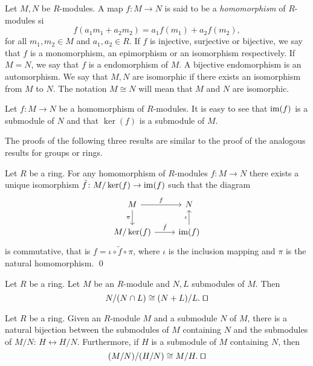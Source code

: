 Let $M,N$ be $R$-modules. A map $f\colon M\rightarrow
N$ is said to be a {\em homomorphism} of $R$-modules si
$$f(a_1m_1+a_2m_2)=a_1f(m_1)+a_2f(m_2),$$
for all $m_1,m_2\in M$ and $a_1,a_2\in R$.
If $f$ is injective, surjective or bijective, we say that $f$ is
a monomorphism, an epimorphism or an isomorphism respectively. If $M=N$, we say that
$f$ is a endomorphism of $M$. A bijective endomorphism is an
automorphism. We say that $M,N$ are isomorphic if there exists an isomorphism from $M$ to $N$. The notation
$M\cong N$ will mean that $M$ and $N$ are isomorphic.

Let $f\colon M\rightarrow N$ be a homomorphism of $R$-modules. It is easy to see that $\operatorname{im}(f)$ is a submodule
of $N$ and that $\ker(f)$ is a submodule of $M$.

The proofs of the following three results are similar to the proof of the analogous results for groups or rings. 
 
\begin{theorem}
Let $R$ be a ring.	For any homomorphism of $R$-modules $f\colon M\rightarrow N$ there exists a unique isomorphism $\tilde f\colon M/\ker(f)\rightarrow\operatorname{im}(f)$ such that the diagram
	\[\begin{tikzcd}
		{M} & {N} \\
		{M/\ker(f)} & {\im(f)}
		\arrow["f", from=1-1, to=1-2]
		\arrow["{\pi}"', from=1-1, to=2-1]
		\arrow["{\iota}", from=2-2, to=1-2]
		\arrow["{\tilde f}", from=2-1, to=2-2]
	\end{tikzcd}
	\]
	is commutative, that is $f=\iota\circ \tilde f\circ\pi$, where $\iota$ is the inclusion mapping and $\pi$ is the natural homomorphism. \qed	
\end{theorem} 


\begin{theorem}
Let $R$ be a ring.	Let $M$ be an $R$-module and $N,L$ submodules of $M$. Then 
	$$N/(N\cap L)\cong (N+L)/L. \; \qed$$  
\end{theorem}

\begin{theorem} Let $R$ be a ring. Given an $R$-module $M$ and a submodule $N$ of $M$, there is a natural bijection between the submodules of $M$ containing $N$ and the submodules of $M/N$: $H\leftrightarrow H/N$. Furthermore, if $H$ is a submodule of $M$ containing $N$, then
	$$(M/N)/(H/N)\cong M/H.\; \qed$$ 
\end{theorem}



